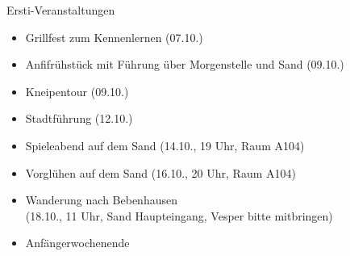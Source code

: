 \documentclass{beamer}
\begin{document}
	\begin{frame}{Ersti-Veranstaltungen}
		\begin{itemize}
			\item Grillfest zum Kennenlernen (07.10.)
			\item Anfifrühstück mit Führung über Morgenstelle und Sand (09.10.)
			\item Kneipentour (09.10.)
			\item Stadtführung (12.10.)
			\item Spieleabend auf dem Sand (14.10., 19 Uhr, Raum A104)
			\item Vorglühen auf dem Sand (16.10., 20 Uhr, Raum A104)
			\item Wanderung nach Bebenhausen \\ (18.10., 11 Uhr, Sand Haupteingang, Vesper bitte mitbringen) 
			\item Anfängerwochenende
		\end{itemize}
	\end{frame}





	
\end{document}

